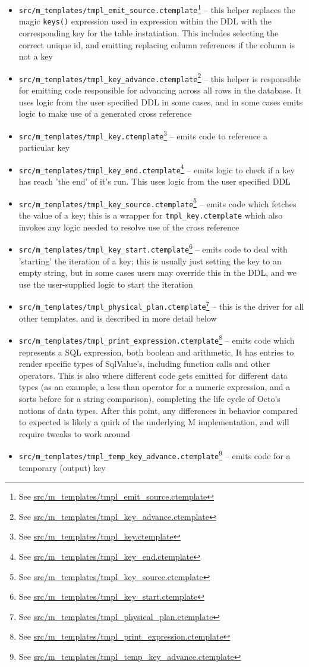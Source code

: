 \documentclass[]{article}
\def\code#1{\texttt{#1}}
\newcommand{\gitlab}[1]{\footnote{See \href{https://gitlab.com/YottaDB/DBMS/YDBOcto/blob/master/#1}{#1}}}
\begin{document}
\begin{itemize}
	\item \code{src/m\_templates/tmpl\_emit\_source.ctemplate}\gitlab{src/m\_templates/tmpl\_emit\_source.ctemplate} -- this helper replaces the magic \code{keys()} expression used in expression within the DDL with the corresponding key for the table instatiation. This includes selecting the correct unique id, and emitting replacing column references if the column is not a key
	\item \code{src/m\_templates/tmpl\_key\_advance.ctemplate}\gitlab{src/m\_templates/tmpl\_key\_advance.ctemplate} -- this helper is responsible for emitting code responsible for advancing across all rows in the database. It uses logic from the user specified DDL in some cases, and in some cases emits logic to make use of a generated cross reference
	\item \code{src/m\_templates/tmpl\_key.ctemplate}\gitlab{src/m\_templates/tmpl\_key.ctemplate} -- emits code to reference a particular key
	\item \code{src/m\_templates/tmpl\_key\_end.ctemplate}\gitlab{src/m\_templates/tmpl\_key\_end.ctemplate} -- emits logic to check if a key has reach 'the end' of it's run. This uses logic from the user specified DDL
	\item \code{src/m\_templates/tmpl\_key\_source.ctemplate}\gitlab{src/m\_templates/tmpl\_key\_source.ctemplate} -- emits code which fetches the value of a key; this is a wrapper for \code{tmpl\_key.ctemplate} which also invokes any logic needed to resolve use of the cross reference
	\item \code{src/m\_templates/tmpl\_key\_start.ctemplate}\gitlab{src/m\_templates/tmpl\_key\_start.ctemplate} -- emits code to deal with 'starting' the iteration of a key; this is usually just setting the key to an empty string, but in some cases users may override this in the DDL, and we use the user-supplied logic to start the iteration
	\item \code{src/m\_templates/tmpl\_physical\_plan.ctemplate}\gitlab{src/m\_templates/tmpl\_physical\_plan.ctemplate} -- this is the driver for all other templates, and is described in more detail below
	\item \code{src/m\_templates/tmpl\_print\_expression.ctemplate}\gitlab{src/m\_templates/tmpl\_print\_expression.ctemplate} -- emits code which represents a SQL expression, both boolean and arithmetic. It has entries to render specific types of SqlValue's, including function calls and other operators. This is also where different code gets emitted for different data types (as an example, a less than operator for a numeric expression, and a sorts before for a string comparison), completing the life cycle of Octo's notions of data types. After this point, any differences in behavior compared to expected is likely a quirk of the underlying M implementation, and will require tweaks to work around
	\item \code{src/m\_templates/tmpl\_temp\_key\_advance.ctemplate}\gitlab{src/m\_templates/tmpl\_temp\_key\_advance.ctemplate} -- emits code for a temporary (output) key

\end{itemize}
\end{document}

